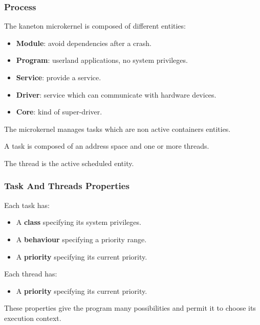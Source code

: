 \begin{frame}
  \frametitle{Process}

  The kaneton microkernel is composed of different entities:

  \begin{itemize}
    \item
      \textbf{Module}: avoid dependencies after a crash.
    \item
      \textbf{Program}: userland applications, no system privileges.
    \item
      \textbf{Service}: provide a service.
    \item
      \textbf{Driver}: service which can communicate with hardware devices.
    \item
      \textbf{Core}: kind of super-driver.
  \end{itemize}

  \nl

  The microkernel manages tasks which are non active containers
  entities.

  \nl

  A task is composed of an address space and one or more threads.

  \nl

  The thread is the active scheduled entity.
\end{frame}


\begin{frame}
  \frametitle{Task And Threads Properties}

  Each task has:

  \begin{itemize}
    \item
      A \textbf{class} specifying its system privileges.
    \item
      A \textbf{behaviour} specifying a priority range.
    \item
      A \textbf{priority} specifying its current priority.
  \end{itemize}

  \nl

  Each thread has:

  \begin{itemize}
    \item
      A \textbf{priority} specifying its current priority.
  \end{itemize}

  \nl

  These properties give the program many possibilities and
  permit it to choose its execution context.
\end{frame}

